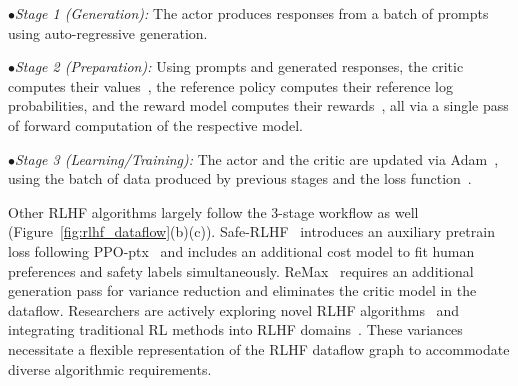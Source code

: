 \noindent $\bullet$\textit{Stage 1 (Generation):} The actor produces responses from a batch of prompts using auto-regressive generation.

\noindent $\bullet$\textit{Stage 2 (Preparation): }Using prompts and generated responses, the critic computes their values~\cite{schulman2017proximal, schulman2015trust}, the reference policy computes their reference log probabilities, and the reward model computes their rewards~\cite{ouyang2022training, bai2022training}, all via a single pass of forward computation of the respective model. %

\noindent $\bullet$\textit{Stage 3 (Learning/Training): }The actor and the critic are updated via Adam~\cite{kingma2017adam}, 
using the batch of data produced by previous stages and the loss function~\cite{ouyang2022training}.

Other RLHF algorithms  %
largely follow the 3-stage workflow as well (Figure~\ref{fig:rlhf_dataflow}(b)(c)).
Safe-RLHF~\cite{daiSafeRLHFSafe2023} introduces an auxiliary pretrain loss following PPO-ptx~\cite{ouyang2022training} %
and includes an additional cost model to fit human preferences and safety labels simultaneously. 
ReMax~\cite{li2023remax} %
requires an additional generation pass for variance reduction and eliminates the critic model in the dataflow.
Researchers are actively exploring novel RLHF algorithms~\cite{shao2024deepseekmath, lee2023rlaif, zheng2023improving} and integrating traditional RL methods into RLHF domains~\cite{kaufmann2023survey}. These variances necessitate a flexible representation of the RLHF dataflow graph to accommodate diverse algorithmic requirements.











